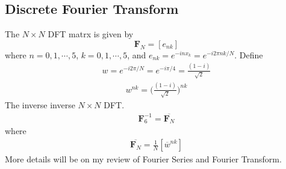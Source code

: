 \subsection{Discrete Fourier Transform}
The $N\times N$ DFT matrx is given by $$\bm{F}_N=[e_{nk}]$$ where $n=0,1,\cdots,5$, $k=0,1,\cdots,5$, and
$e_{nk}=e^{-inx_k}=e^{-i2\pi nk/N}$.
Define
\begin{align}
  w=e^{-i2\pi /N}=e^{-i\pi /4}=\frac{(1-i)}{\sqrt{2}}
\end{align}
\begin{align}
  w^{nk}=\Big(\frac{(1-i)}{\sqrt{2}}\Big)^{nk}
\end{align}
The inverse inverse $N\times N$ DFT.
\begin{align}
  \bm{F}_6^{-1}=\overline{\bm{F}_{N}}
\end{align}
where
\begin{align}
  \overline{\bm{F}_{N}}=\frac{1}{N}[\overline{w}^{nk}]
\end{align}
\noindent More details will be on my review of Fourier Series and Fourier Transform.

